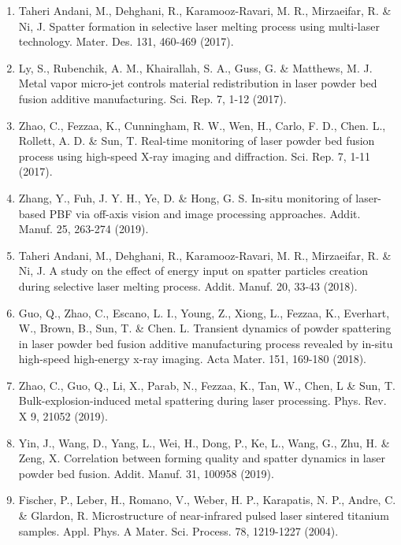 \documentclass[10pt]{article}
\begin{document}
\begin{enumerate}
  \item Taheri Andani, M., Dehghani, R., Karamooz-Ravari, M. R., Mirzaeifar, R. \& Ni, J. Spatter formation in selective laser melting process using multi-laser technology. Mater. Des. 131, 460-469 (2017).

  \item Ly, S., Rubenchik, A. M., Khairallah, S. A., Guss, G. \& Matthews, M. J. Metal vapor micro-jet controls material redistribution in laser powder bed fusion additive manufacturing. Sci. Rep. 7, 1-12 (2017).

  \item Zhao, C., Fezzaa, K., Cunningham, R. W., Wen, H., Carlo, F. D., Chen. L., Rollett, A. D. \& Sun, T. Real-time monitoring of laser powder bed fusion process using high-speed X-ray imaging and diffraction. Sci. Rep. 7, 1-11 (2017).

  \item Zhang, Y., Fuh, J. Y. H., Ye, D. \& Hong, G. S. In-situ monitoring of laser-based PBF via off-axis vision and image processing approaches. Addit. Manuf. 25, 263-274 (2019).

  \item Taheri Andani, M., Dehghani, R., Karamooz-Ravari, M. R., Mirzaeifar, R. \& Ni, J. A study on the effect of energy input on spatter particles creation during selective laser melting process. Addit. Manuf. 20, 33-43 (2018).

  \item Guo, Q., Zhao, C., Escano, L. I., Young, Z., Xiong, L., Fezzaa, K., Everhart, W., Brown, B., Sun, T. \& Chen. L. Transient dynamics of powder spattering in laser powder bed fusion additive manufacturing process revealed by in-situ high-speed high-energy x-ray imaging. Acta Mater. 151, 169-180 (2018).

  \item Zhao, C., Guo, Q., Li, X., Parab, N., Fezzaa, K., Tan, W., Chen, L \& Sun, T. Bulk-explosion-induced metal spattering during laser processing. Phys. Rev. X 9, 21052 (2019).

  \item Yin, J., Wang, D., Yang, L., Wei, H., Dong, P., Ke, L., Wang, G., Zhu, H. \& Zeng, X. Correlation between forming quality and spatter dynamics in laser powder bed fusion. Addit. Manuf. 31, 100958 (2019).

  \item Fischer, P., Leber, H., Romano, V., Weber, H. P., Karapatis, N. P., Andre, C. \& Glardon, R. Microstructure of near-infrared pulsed laser sintered titanium samples. Appl. Phys. A Mater. Sci. Process. 78, 1219-1227 (2004).


\end{enumerate}
\end{document}
